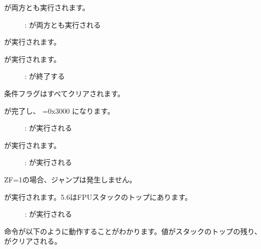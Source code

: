 \clearpage
{}

\FLD が両方とも実行されます。

\begin{figure}[H]
\centering
{}
\caption{\olly: \FLD が両方とも実行される}
\label{fig:FPU_comparison_Ox_case2_olly1}
\end{figure}

\FLD が実行されます。

\clearpage
\FCOM が実行されます。

\begin{figure}[H]
\centering
{}
\caption{\olly: \FCOM が終了する}
\label{fig:FPU_comparison_Ox_case2_olly2}
\end{figure}

条件フラグはすべてクリアされます。

\clearpage
\FNSTSW が完了し、 =0x3000 になります。

\begin{figure}[H]
\centering
{}
\caption{\olly: \FNSTSW が実行される}
\label{fig:FPU_comparison_Ox_case2_olly3}
\end{figure}

\clearpage
\TEST が実行されます。

\begin{figure}[H]
\centering
{}
\caption{\olly: \TEST が実行される}
\label{fig:FPU_comparison_Ox_case2_olly4}
\end{figure}

ZF=1の場合、ジャンプは発生しません。

\clearpage
\FSTP {}が実行されます。5.6はFPUスタックのトップにあります。

\begin{figure}[H]
\centering
{}
\caption{\olly: \FSTP が実行される}
\label{fig:FPU_comparison_Ox_case2_olly5}
\end{figure}

\FSTP {}命令が以下のように動作することがわかります。値がスタックのトップの残り、がクリアされる。
